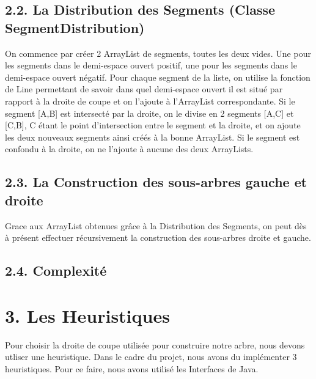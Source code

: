 \documentclass[a4paper,12pt]{report}	%
\begin{document}
    {\subsection*{2.2. La Distribution des Segments (Classe SegmentDistribution)}}
      On commence par créer 2 ArrayList de segments, toutes les deux vides. Une pour les segments dans le demi-espace ouvert positif, une pour
    les segments dans le demi-espace ouvert négatif.
    Pour chaque segment de la liste, on utilise la fonction de Line permettant de savoir dans quel demi-espace ouvert il est situé par rapport
    à la droite de coupe et on l'ajoute à l'ArrayList correspondante.
    Si le segment [A,B] est intersecté par la droite, on le divise en 2 segments [A,C] et [C,B], C étant le point d'intersection entre le segment
    et la droite, et on ajoute les deux nouveaux segments ainsi créés à la bonne ArrayList.
    Si le segment est confondu à la droite, on ne l'ajoute à aucune des deux ArrayLists.\\
     
       
    {\subsection*{2.3. La Construction des sous-arbres gauche et droite}}
      Grace aux ArrayList obtenues grâce à la Distribution des Segments, on peut dès à présent effectuer récursivement la construction des sous-arbres droite et gauche.\\
    
    
    {\subsection*{2.4. Complexité}}
    
    \newpage
    
    {\section*{3. Les Heuristiques}}
      Pour choisir la droite de coupe utilisée pour construire notre arbre, nous devons utliser une heuristique. Dans le cadre du projet, nous avons du implémenter 3 heuristiques. Pour ce faire, nous avons utilisé les Interfaces de Java.\\
    
\end{document}
